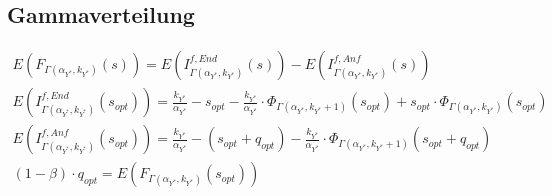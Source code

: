 \subsection{Gammaverteilung}
\begin{gather*}
E\left(F_{\Gamma\left(\alpha_{Y^*},k_{Y^*}\right)}(s)\right)= E\left(I^{f,End}_{\Gamma\left(\alpha_{Y^*},k_{Y^*}\right)}\left(s\right)\right)-E\left(I^{f,Anf}_{\Gamma\left(\alpha_{Y^*},k_{Y^*}\right)}\left(s\right)\right) \\
E\left(I^{f,End}_{\Gamma\left(\alpha_{Y^*},k_{Y^*}\right)}\left(s_{opt}\right)\right)=\frac{k_{Y^*}}{\alpha_{Y^*}}-s_{opt}-\frac{k_{Y^*}}{\alpha_{Y^*}}\cdot \Phi_{\Gamma\left(\alpha_{Y^*},k_{Y^*}+1\right)}\left(s_{opt}\right)+s_{opt}\cdot \Phi_{\Gamma\left(\alpha_{Y^*},k_{Y^*}\right)}\left(s_{opt}\right) \\
E\left(I^{f,Anf}_{\Gamma\left(\alpha_{Y^*},k_{Y^*}\right)}\left(s_{opt}\right)\right)=\frac{k_{Y^*}}{\alpha_{Y^*}}-\left(s_{opt}+q_{opt}\right)-\frac{k_{Y^*}}{\alpha_{Y^*}}\cdot \Phi_{\Gamma\left(\alpha_{Y^*},k_{Y^*}+1\right)}\left(s_{opt}+q_{opt}\right) \\
\left(1-\beta\right)\cdot q_{opt}= E\left(F_{\Gamma\left(\alpha_{Y^*},k_{Y^*}\right)}\left(s_{opt}\right)\right)
\end{gather*}